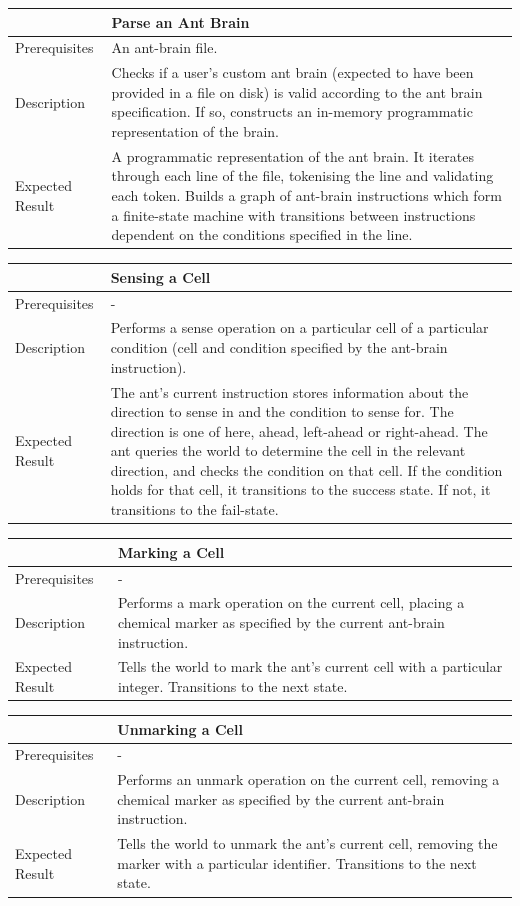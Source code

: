 \documentclass[11pt]{article}
\begin{document}
\begin{longtable}[c]{@{}p{}p{}@{}}
\toprule
& Parse an Ant Brain \tabularnewline
\midrule
Prerequisites & An ant-brain file. \tabularnewline
Description & Checks if a user's custom ant brain (expected to have
been provided in a file on disk) is valid according to the ant brain
specification. If so, constructs an in-memory programmatic
representation of the brain. \tabularnewline
Expected Result & A programmatic representation of the ant brain. It
iterates through each line of the file, tokenising the line and
validating each token. Builds a graph of ant-brain instructions which
form a finite-state machine with transitions between instructions
dependent on the conditions specified in the line. \tabularnewline
\bottomrule
\end{longtable}

\begin{longtable}[c]{@{}p{}p{}@{}}
\toprule
& Sensing a Cell \tabularnewline
\midrule
Prerequisites & - \tabularnewline
Description & Performs a sense operation on a particular cell of a
particular condition (cell and condition specified by the ant-brain
instruction). \tabularnewline
Expected Result & The ant's current instruction stores information about
the direction to sense in and the condition to sense for. The direction
is one of here, ahead, left-ahead or right-ahead. The ant queries the
world to determine the cell in the relevant direction, and checks the
condition on that cell. If the condition holds for that cell, it
transitions to the success state. If not, it transitions to the
fail-state. \tabularnewline
\bottomrule
\end{longtable}

\begin{longtable}[c]{@{}p{}p{}@{}}
\toprule
& Marking a Cell \tabularnewline
\midrule
Prerequisites & - \tabularnewline
Description & Performs a mark operation on the current cell, placing
a chemical marker as specified by the current ant-brain instruction. \tabularnewline
Expected Result & Tells the world to mark the ant's current cell with a
particular integer. Transitions to the next state. \tabularnewline
\bottomrule
\end{longtable}

\begin{longtable}[c]{@{}p{}p{}@{}}
\toprule
& Unmarking a Cell \tabularnewline
\midrule
Prerequisites & - \tabularnewline
Description & Performs an unmark operation on the current cell,
removing a chemical marker as specified by the current ant-brain
instruction. \tabularnewline
Expected Result & Tells the world to unmark the ant's current cell,
removing the marker with a particular identifier. Transitions to the
next state. \tabularnewline
\bottomrule
\end{longtable}
\end{document}
